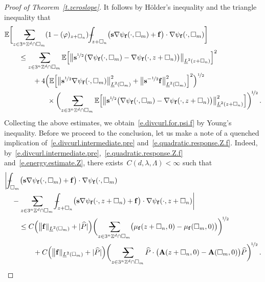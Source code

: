 \documentclass[11pt,twoside]{article} %
\makeatletter
\let\oldsquare\square %
\renewcommand{\square}{\oldsquare}
\numberwithin{equation}{section}
\theoremstyle{definition}
\newcommand*{\Zd}{\ensuremath{\mathbb{Z}^d}}
\renewcommand*{\hat}{\widehat}
\newcommand{\f}{\mathbf{f}}
\newcommand{\s}{\mathbf{s}}
\newcommand{\cu}{\square}
\newcommand{\E}{\mathbb{E}}
\newcommand{\avsum}{\mathop{\mathpalette\avsuminner\relax}\displaylimits}
\newcommand\avsuminner[2]{%
  {\sbox0{$\m@th#1\sum$}%
   \vphantom{\usebox0}%
   \ooalign{%
     \hidewidth
     \smash{\,\rule[.23em]{8.8pt}{1.1pt} \relax}%
     \hidewidth\cr
   ~$\m@th#1\sum$\cr
   }%
  }%
}
\def\Xint#1{\mathchoice
{\XXint\displaystyle\textstyle{#1}}%
{\XXint\textstyle\scriptstyle{#1}}%
{\XXint\scriptstyle\scriptscriptstyle{#1}}%
{\XXint\scriptscriptstyle\scriptscriptstyle{#1}}%
\!\int}
\def\XXint#1#2#3{{\setbox0=\hbox{$#1{#2#3}{\int}$}
\vcenter{\hbox{$#2#3$}}\kern-.5\wd0}}
\def\fint{\Xint-}
\newcommand{\bfA}{\mathbf{A}}
\makeatother
\begin{document}
\begin{proof}[{Proof of Theorem~\ref{t.zeroslope}}]
It follows by H\"older's inequality and the triangle inequality that
\begin{align*} 
\lefteqn{
\E\biggl[ \avsum_{z \in 3^n \Zd \cap \cu_m} (1-(\varphi)_{z + \cu_n}) 
\fint_{z+\cu_n} \bigl( \s \nabla \psi_{\f} (\cdot,\cu_m) + \f \bigr) \cdot \nabla \psi_{\f}(\cdot,\cu_m) \biggr]
} \qquad &
\notag \\ &
\leq  \avsum_{z \in 3^n \Zd\cap \cu_m} \E \Bigl[
\bigl\| \s^{\nicefrac12} \bigl(
\nabla \psi_{\f} (\cdot,\cu_m)-
\nabla \psi_{\f} (\cdot,z+\cu_n) \bigr) \bigr\|_{\underline{L}^2(z+\cu_n)} 
 \Bigr]^2 
 \notag \\ & \qquad 
 + 
4 \Bigl( \E \Bigl[
\bigl\| \s^{\nicefrac12} \nabla \psi_{\f}(\cdot,\cu_m) \bigr\|_{\underline{L}^2(\cu_m)}^2 
+
\bigl\| \s^{-\nicefrac12} \f \bigr\|_{\underline{L}^2(\cu_m)}^2 
\Bigr]^2   \Bigr)^{\nicefrac12} 
\notag \\ & \qquad \qquad
\times
\biggl( \avsum_{z \in 3^n \Zd\cap \cu_m} \E \Bigl[
\bigl\| \s^{\nicefrac12} \bigl(
\nabla \psi_{\f} (\cdot,\cu_m)-
\nabla \psi_{\f} (\cdot,z+\cu_n) \bigr) \bigr\|_{\underline{L}^2(z+\cu_n)}^2 
 \Bigr] \biggr)^{\!\nicefrac12}
\,.
\end{align*}
Collecting the above estimates, we obtain~\eqref{e.divcurl.for.psi.f} by Young's inequality. Before we proceed to the conclusion, let us make a note of a quenched implication of~\eqref{e.divcurl.intermediate.pre} and~\eqref{e.quadratic.response.Z.f}. Indeed, by~\eqref{e.divcurl.intermediate.pre},~\eqref{e.quadratic.response.Z.f} and~\eqref{e.energy.estimate.Z}, there exists~$C(d,\lambda,\Lambda)<\infty$ such that
\begin{align} 
\label{e.divcurl.intermediate}
\lefteqn{
\biggl| \fint_{\cu_m} \bigl( \s \nabla \psi_{\f} (\cdot,\cu_m) + \f \bigr) \cdot \nabla \psi_{\f}(\cdot,\cu_m) 
} \quad &
\notag \\ &
- 
\avsum_{z \in 3^n \Zd \cap \cu_m} \fint_{z+\cu_n}  \bigl( \s \nabla \psi_{\f} (\cdot,z+\cu_n) + \f \bigr) \cdot \nabla \psi_{\f}(\cdot,z+\cu_n) \biggr|
\notag \\ & \quad 
\leq 
C \Bigl( \bigl\| \f \|_{\underline{L}^2(\cu_m)} + |\hat P| \Bigr)
\biggl( \avsum_{z \in 3^n \Zd \cap \cu_m}  \bigl( \mu_{\f}(z+\cu_n,0) - \mu_{\f}(\cu_m,0)  \bigr) \biggr)^{\!\nicefrac12}
\notag \\ & \quad \qquad 
+
C \Bigl( \bigl\| \f \|_{\underline{L}^2(\cu_m)} + |\hat P| \Bigr)
\biggl( \avsum_{z \in 3^n \Zd \cap \cu_m}  \hat P \cdot \bigl( \bfA(z+\cu_n,0) - \bfA(\cu_m,0) \bigr)\hat P \biggr)^{\!\nicefrac12}
\,.
\end{align}



\end{proof}
\end{document}
